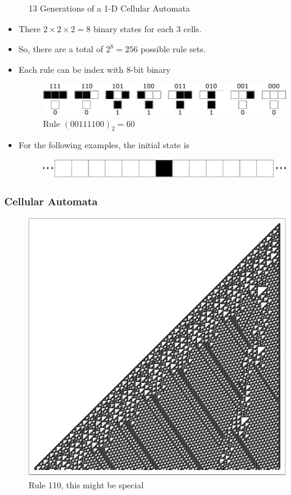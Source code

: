\documentclass{beamer}
\begin{document}
\begin{frame}
\begin{figure}
        \caption{13 Generations of a 1-D Cellular Automata}
    \end{figure}
\end{frame}

\begin{frame}
    \begin{itemize}
        \item There $2\times2\times2=8$ binary states for each 3 cells.
        \item So, there are a total of $2^8 = 256$ possible rule sets.
        \item Each rule can be index with 8-bit binary
        \begin{figure}
            \centering
            \includegraphics[scale=0.7]{rule60Num.pdf}
            \caption{Rule $(00111100)_2 = 60$}
        \end{figure}
        \item For the following examples, the initial state is
        \begin{figure}
            \centering 
            \includegraphics[scale=0.6]{initial.pdf}
        \end{figure}
    \end{itemize}
\end{frame}

\begin{frame}
    \frametitle{Cellular Automata}
    \begin{figure}
        \centering
        \includegraphics[scale=0.53]{fig4.pdf}
        \caption{Rule 110, this might be special}
    \end{figure}
\end{frame}
\end{document}
